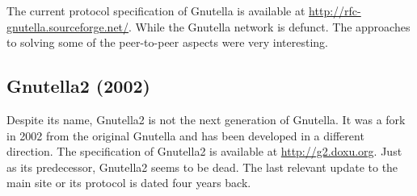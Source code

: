 The current protocol specification of Gnutella is available at  \href{http://rfc-gnutella.sourceforge.net/developer/stable/index.html}{http://rfc-gnutella.sourceforge.net/}. While the Gnutella network is defunct. The approaches to solving some of the peer-to-peer aspects were very interesting.

\subsection{Gnutella2 (2002)}
Despite its name, Gnutella2 is not the next generation of Gnutella. It was a fork in 2002 from the original Gnutella and has been developed in a different direction. The specification of Gnutella2 is available at \url{http://g2.doxu.org}. Just as its predecessor, Gnutella2 seems to be dead. The last relevant update to the main site or its protocol is dated four years back.

